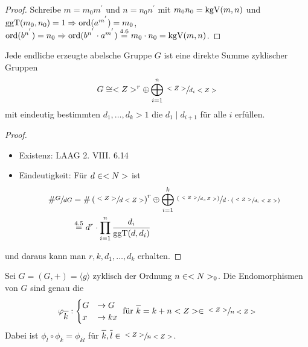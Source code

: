 \begin{proof}
	Schreibe $m = m_0 m^{'}$ und $n = n_0 n^{'}$ mit $m_0 n_0 = \operatorname{kgV}(m,n)$ und $\operatorname{ggT}(m_0, n_0) = 1 \Rightarrow \operatorname{ord}(a^{m^{'}}) = m_0$, $\operatorname{ord}(b^{n^{'}}) = n_0 \Rightarrow \operatorname{ord}(b^{n^{'}} \cdot a^{m^{'}}) \overset{4.6}{=} m_0 \cdot n_0 = \operatorname{kgV}(m,n)$.
\end{proof}

\begin{theorem}
	Jede endliche erzeugte abelsche Gruppe $G$ ist eine direkte Summe zyklischer Gruppen
	\begin{align}
		G \cong <Z>^{r} \oplus\bigoplus_{i=1}^n \sfrac{<Z>}{d_i <Z>} \notag
	\end{align}
	mit eindeutig bestimmten $d_1, \dots, d_k > 1$ die $d_1 \mid d_{i+1}$ für alle $i$ erfüllen.
\end{theorem}

\begin{proof}
	\begin{itemize}
		\item Existenz: LAAG 2. VIII. 6.14
		\item Eindeutigkeit: Für $d \in <N>$ ist 
		\begin{align}
			\# \qraum{G}{dG} &= \#\left( \qraum{\whole}{d \whole}\right)^r \oplus \bigoplus_{i=1}^k \qraum{\left(\qraum{\whole}{d_\whole}\right)}{d\cdot\left(\qraum{\whole}{d_i\whole}\right)} \notag \\
			&\overset{4.5}{=} d^r \cdot \prod_{i=1}^{n} \frac{d_i}{\ggT(d,d_i)}\notag
		\end{align} 
	\end{itemize}
und daraus kann man $r, k, d_1, \dots , d_k$ erhalten.
\end{proof}

\begin{lemma}
	Sei $G=(G,+) = \langle g\rangle$ zyklisch der Ordnung $n \in <N>_0$. Die Endomorphismen von $G$ sind genau die 
	\begin{align}
		\phi_{\overline{k}}: \begin{cases}
		G &\to G \\
		x &\to kx
		\end{cases} \text{ für } \overline{k} = k + n\whole \in \qraum{\whole}{n\whole}
	\end{align}
	Dabei ist $\phi_{\overline{l}}\circ\phi_{\overline{k}} = \phi_{\overline{kl}}$ für $\overline{k}, \overline{l} \in \qraum{\whole}{n\whole}$.\notag
\end{lemma}

